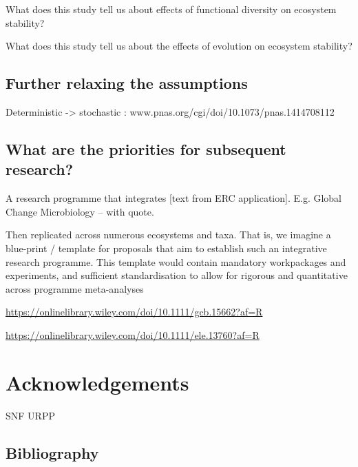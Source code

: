 \documentclass{article}
\begin{document}
What does this study tell us about effects of functional diversity on
ecosystem stability?

What does this study tell us about the effects of evolution on ecosystem
stability?

\hypertarget{further-relaxing-the-assumptions}{%
\subsection{Further relaxing the
assumptions}\label{further-relaxing-the-assumptions}}

Deterministic -\textgreater{} stochastic :
www.pnas.org/cgi/doi/10.1073/pnas.1414708112

\hypertarget{what-are-the-priorities-for-subsequent-research}{%
\subsection{What are the priorities for subsequent
research?}\label{what-are-the-priorities-for-subsequent-research}}

A research programme that integrates {[}text from ERC application{]}.
E.g. Global Change Microbiology -- with quote.

Then replicated across numerous ecosystems and taxa. That is, we imagine
a blue-print / template for proposals that aim to establish such an
integrative research programme. This template would contain mandatory
workpackages and experiments, and sufficient standardisation to allow
for rigorous and quantitative across programme meta-analyses

\url{https://onlinelibrary.wiley.com/doi/10.1111/gcb.15662?af=R}

\url{https://onlinelibrary.wiley.com/doi/10.1111/ele.13760?af=R}

\hypertarget{acknowledgements}{%
\section{Acknowledgements}\label{acknowledgements}}

SNF URPP

\hypertarget{bibliography}{%
\subsection*{Bibliography}\label{bibliography}}
\end{document}
